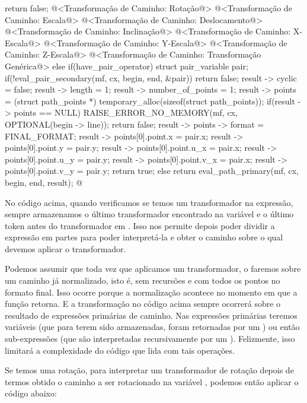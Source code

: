 {{{{{{{{      return false;
    @<Transformação de Caminho: Rotação@>
    @<Transformação de Caminho: Escala@>
    @<Transformação de Caminho: Deslocamento@>
    @<Transformação de Caminho: Inclinação@>
    @<Transformação de Caminho: X-Escala@>
    @<Transformação de Caminho: Y-Escala@>
    @<Transformação de Caminho: Z-Escala@>
    @<Transformação de Caminho: Transformação Genérica@>
  }
  else if(have_pair_operator){
    struct pair_variable pair;
    if(!eval_pair_secondary(mf, cx, begin, end, &pair))
      return false;
    result -> cyclic = false;
    result -> length = 1;
    result -> number_of_points = 1;
    result -> points = (struct path_points *)
                         temporary_alloc(sizeof(struct path_points));
    if(result -> points == NULL){
      RAISE_ERROR_NO_MEMORY(mf, cx, OPTIONAL(begin -> line));
      return false;
    }
    result -> points -> format = FINAL_FORMAT;
    result -> points[0].point.x = pair.x;
    result -> points[0].point.y = pair.y;
    result -> points[0].point.u_x = pair.x;
    result -> points[0].point.u_y = pair.y;
    result -> points[0].point.v_x = pair.x;
    result -> points[0].point.v_y = pair.y;
    return true;    
  }
  else
    return eval_path_primary(mf, cx, begin, end, result);
}
@
\fimcodigo

No código acima, quando verificamos se temos um transformador na
expressão, sempre armazenamos o último transformador encontrado na
variável  e o último token antes do
transformador em . Isso nos permite
depois poder dividir a expressão em partes para poder interpretá-la e
obter o caminho sobre o qual devemos aplicar o transformador.

Podemos assumir que toda vez que aplicamos um transformador, o faremos
sobre um caminho já normalizado, isto é, sem recursões e com todos os
pontos no formato final. Isso ocorre porque a normalização acontece no
momento em que a função  retorna. E
a transformação no código acima sempre ocorrerá sobre o resultado de
expressões primárias de caminho. Nas expressões primárias teremos
variáveis (que para terem sido armazenadas, foram retornadas por
um ) ou então sub-expressões (que
são interpretadas recursivamente por
um ). Felizmente, isso limitará a
complexidade do código que lida com tais operações.

Se temos uma rotação, para interpretar um transformador de rotação
depois de termos obtido o caminho a ser rotacionado na
variável , podemos então aplicar o código abaixo:

}}}}}}
